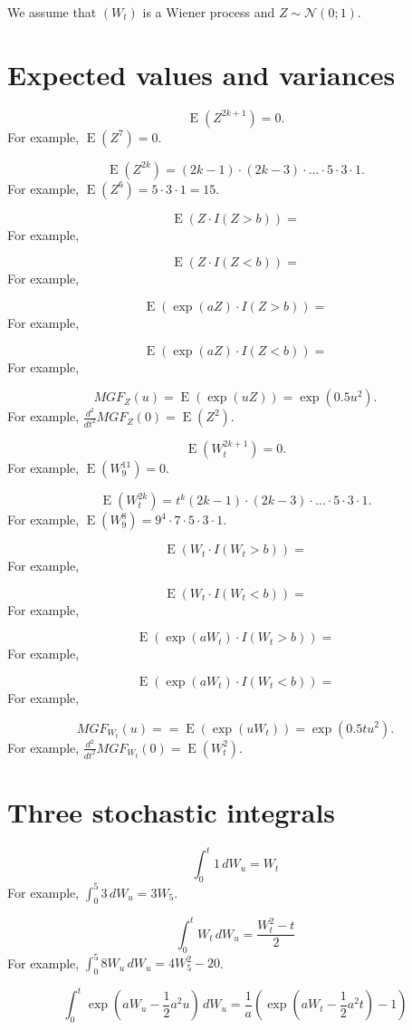 \documentclass[12pt]{article} %
\theoremstyle{definition} %
\DeclareMathOperator{\E}{E}
\newcommand \cN{\mathcal{N}}
\begin{document}
We assume that $(W_t)$ is a Wiener process and $Z\sim \cN(0;1)$.


\section*{Expected values and variances}

\[
\E(Z^{2k+1}) = 0.
\]
For example, $\E(Z^7) = 0$.


\[
\E(Z^{2k}) = (2k-1) \cdot (2k-3) \cdot \ldots \cdot 5 \cdot 3 \cdot 1.    
\]
For example, $\E(Z^6) = 5 \cdot 3 \cdot 1 = 15$.


\[
\E(Z \cdot I(Z > b)) =   
\]
For example, 

\[
\E(Z \cdot I(Z < b)) =   
\]
For example, 

\[
\E(\exp(aZ) \cdot I(Z > b)) =   
\]
For example, 

\[
\E(\exp(aZ) \cdot I(Z < b)) =   
\]
For example, 



\[
MGF_Z(u) = \E(\exp(u Z)) = \exp(0.5 u^2).
\]
For example, $\frac{d^2}{dt^2} MGF_Z(0) = \E(Z^2)$. 


\[
\E(W_t^{2k+1}) = 0.
\]
For example, $\E(W_9^{11}) = 0$.


\[
\E(W_t^{2k}) = t^k (2k-1) \cdot (2k-3) \cdot \ldots \cdot 5 \cdot 3 \cdot 1.    
\]
For example, $\E(W_9^8) = 9^4 \cdot 7\cdot  5 \cdot 3 \cdot 1$.


\[
\E(W_t \cdot I(W_t > b)) =   
\]
For example, 

\[
\E(W_t \cdot I(W_t < b)) =   
\]
For example, 

\[
\E(\exp(aW_t) \cdot I(W_t > b)) =   
\]
For example, 

\[
\E(\exp(aW_t) \cdot I(W_t < b)) =   
\]
For example, 



\[
MGF_{W_t}(u) = = \E(\exp(u W_t)) = \exp(0.5 t u^2).
\]
For example, $\frac{d^2}{dt^2} MGF_{W_t}(0) = \E(W_t^2)$. 


\section*{Three stochastic integrals}

\[
    \int_0^t 1 \, dW_u = W_t
\]
For example, $\int_0^5 3 \, dW_u = 3 W_5$.

\[
    \int_0^t W_t \, dW_u = \frac{W_t^2 - t}{2}
\]
For example, $\int_0^5 8 W_u \, dW_u = 4 W_5^2 - 20$.

\[
    \int_0^t \exp(aW_u -\frac{1}{2} a^2 u) \, dW_u = \frac{1}{a}\left(\exp(aW_t - \frac{1}{2}a^2 t) - 1\right) 
\]
\end{document}
